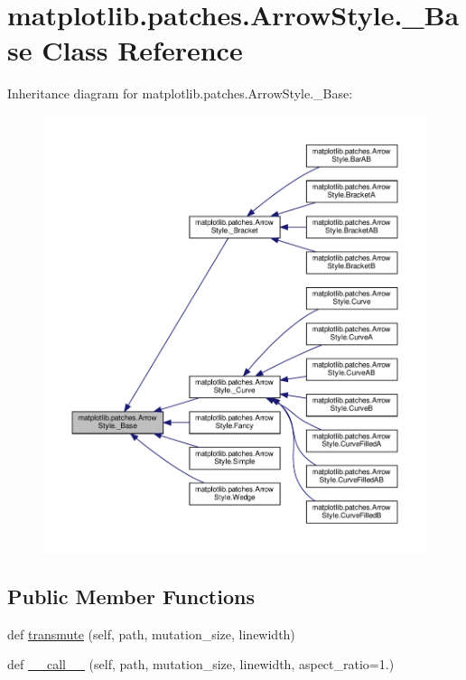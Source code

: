\hypertarget{classmatplotlib_1_1patches_1_1ArrowStyle_1_1__Base}{}\section{matplotlib.\+patches.\+Arrow\+Style.\+\_\+\+Base Class Reference}
\label{classmatplotlib_1_1patches_1_1ArrowStyle_1_1__Base}


Inheritance diagram for matplotlib.\+patches.\+Arrow\+Style.\+\_\+\+Base\+:
\nopagebreak
\begin{figure}[H]
\begin{center}
\leavevmode
\includegraphics[width=350pt]{classmatplotlib_1_1patches_1_1ArrowStyle_1_1__Base__inherit__graph}
\end{center}
\end{figure}
\subsection*{Public Member Functions}
\begin{DoxyCompactItemize}
\item 
def \hyperlink{classmatplotlib_1_1patches_1_1ArrowStyle_1_1__Base_ae476ccd3f777a9e6f457106ce7ee0de7}{transmute} (self, path, mutation\+\_\+size, linewidth)
\item 
def \hyperlink{classmatplotlib_1_1patches_1_1ArrowStyle_1_1__Base_a11d4ecff5c52fbe88934045e623ad254}{\+\_\+\+\_\+call\+\_\+\+\_\+} (self, path, mutation\+\_\+size, linewidth, aspect\+\_\+ratio=1.)
\end{DoxyCompactItemize}
